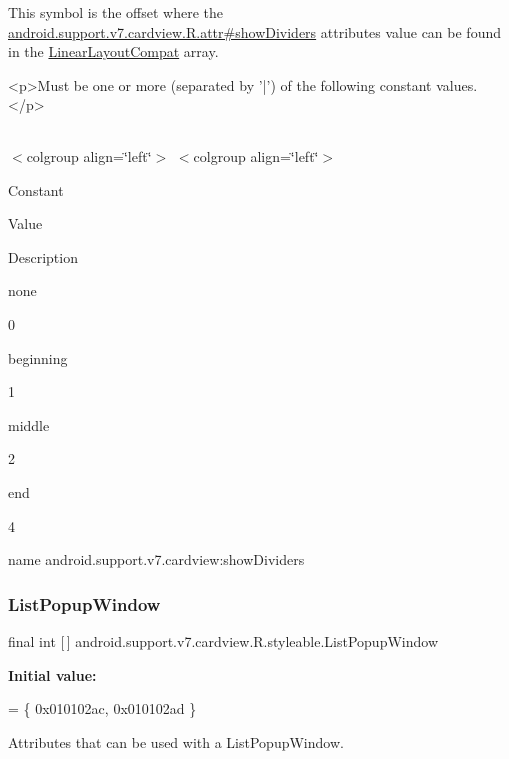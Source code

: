 This symbol is the offset where the \hyperlink{classandroid_1_1support_1_1v7_1_1cardview_1_1R_1_1attr_aee3b93a16dbd1e9064e91302644b0209}{android.\+support.\+v7.\+cardview.\+R.\+attr\#show\+Dividers} attribute\textquotesingle{}s value can be found in the \hyperlink{classandroid_1_1support_1_1v7_1_1cardview_1_1R_1_1styleable_a700813433e97ff82dc1f2263b2072586}{Linear\+Layout\+Compat} array.

\begin{DoxyVerb}      <p>Must be one or more (separated by '|') of the following constant values.</p>
\end{DoxyVerb}
 \tabulinesep=1mm
\begin{longtabu} spread 0pt [c]{*{0}{|X[-1]}|}
\hline
\end{longtabu}
$<$colgroup align=\char`\"{}left\char`\"{}$>$ $<$colgroup align=\char`\"{}left\char`\"{}$>$ 

Constant

Value

Description 

{\ttfamily none}

0

{\ttfamily beginning}

1

{\ttfamily middle}

2

{\ttfamily end}

4

name android.\+support.\+v7.\+cardview\+:show\+Dividers \mbox{\label{classandroid_1_1support_1_1v7_1_1cardview_1_1R_1_1styleable_a7cfe822c983ad9ac00d6f47da2fb0ee4}} 
\subsubsection{\texorpdfstring{List\+Popup\+Window}{ListPopupWindow}}
{\footnotesize\ttfamily final int \mbox{[}$\,$\mbox{]} android.\+support.\+v7.\+cardview.\+R.\+styleable.\+List\+Popup\+Window\hspace{0.3cm}{\ttfamily [static]}}

{\bfseries Initial value\+:}
\begin{DoxyCode}
= \{
            0x010102ac, 0x010102ad
        \}
\end{DoxyCode}
Attributes that can be used with a List\+Popup\+Window. 

